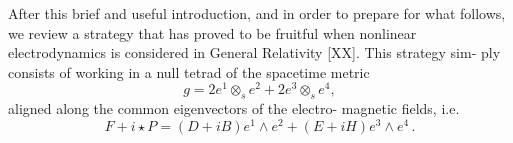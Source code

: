 After this brief and useful introduction, and in order to prepare for what follows, we review a strategy that has proved to be fruitful when nonlinear electrodynamics is considered in General Relativity [XX]. This strategy sim- ply consists of working in a null tetrad of the spacetime metric
\begin{equation}
  g=2e^1\otimes_s e^2+2e^3\otimes_s e^4, 
\end{equation}
aligned along the common eigenvectors of the electro-
magnetic fields, i.e.
\begin{equation}
  F+i \star P=(D+iB)e^1\wedge e^2+(E+iH)e^3\wedge e^4\, .
\end{equation}








